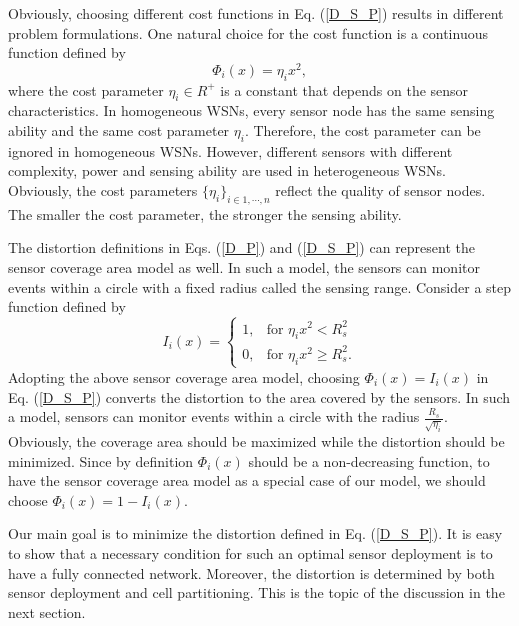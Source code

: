 \documentclass[journal,draftcls,onecolumn,12pt,twoside, narroweqnarray]{IEEEtran}
\begin{document}
Obviously, choosing different cost functions in Eq. (\ref{D_S_P}) results in different problem formulations. One natural choice for the cost function is a continuous function defined by
\begin{equation}
    \Phi_i(x)=\eta_ix^2,
\end{equation}
where the cost parameter $\eta_i\in R^+$ is a constant that depends on the sensor characteristics. In homogeneous WSNs, every sensor node has the same sensing ability and the same cost parameter $\eta_i$. Therefore, the cost parameter can be ignored in homogeneous WSNs. However, different sensors with different complexity, power and sensing ability are used in heterogeneous WSNs. Obviously, the cost parameters $\{\eta_i\}_{i\in1,\cdots,n}$ reflect the quality of sensor nodes. The smaller the cost parameter, the stronger the sensing ability.


The distortion definitions in Eqs. (\ref{D_P}) and (\ref{D_S_P}) can represent the sensor coverage area model \cite{SD} as well. In such a model, the sensors can monitor events within a circle with a fixed radius called the sensing range. Consider a step function defined by
\begin{equation}
    I_i(x)=
    \begin{cases}
    1, &\mbox{for $\eta_ix^2<R_s^2$}\\
    0, &\mbox{for $\eta_ix^2\geq R_s^2$}.
    \end{cases}\label{step_cost}
\end{equation}
Adopting the above sensor coverage area model, choosing $\Phi_i(x)=I_i(x)$ in Eq. (\ref{D_S_P}) converts the distortion to the area covered by the sensors. In such a model, sensors can monitor events within a circle with the radius $\frac{R_s}{\sqrt{\eta_i}}$. Obviously, the coverage area should be maximized while the distortion should be minimized. Since by definition $\Phi_i(x)$ should be a non-decreasing function, to have the sensor coverage area model as a special case of our model, we should choose $\Phi_i(x)=1-I_i(x)$.

Our main goal is to minimize the distortion defined in Eq. (\ref{D_S_P}). It is easy to show that a necessary condition for such an optimal sensor deployment is to have a fully connected network. Moreover, the distortion is determined by both sensor deployment and cell partitioning. This is the topic of the  discussion in the next section.
\end{document}
